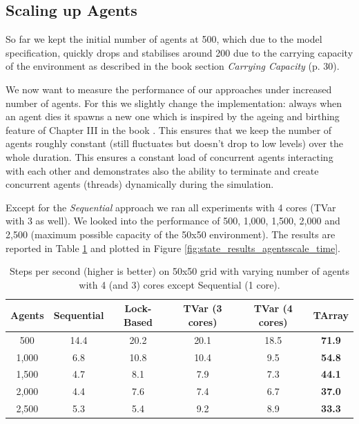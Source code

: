 \subsection{Scaling up Agents}
So far we kept the initial number of agents at 500, which due to the model specification, quickly drops and stabilises around 200 due to the carrying capacity of the environment as described in the book \cite{epstein_growing_1996} section \textit{Carrying Capacity} (p. 30).

We now want to measure the performance of our approaches under increased number of agents. For this we slightly change the implementation: always when an agent dies it spawns a new one which is inspired by the ageing and birthing feature of Chapter III in the book \cite{epstein_growing_1996}. This ensures that we keep the number of agents roughly constant (still fluctuates but doesn't drop to low levels) over the whole duration. This ensures a constant load of concurrent agents interacting with each other and demonstrates also the ability to terminate and create concurrent agents (threads) dynamically during the simulation.

Except for the \textit{Sequential} approach we ran all experiments with 4 cores (TVar with 3 as well). We looked into the performance of 500, 1,000, 1,500, 2,000 and 2,500 (maximum possible capacity of the 50x50 environment). The results are reported in Table \ref{tab:state_results_agentsscale_time} and plotted in Figure \ref{fig:state_results_agentsscale_time}.

\begin{table}
	\centering
  	\begin{tabular}{ c || c | c | c | c | c }
        Agents  & Sequential & Lock-Based & TVar (3 cores) & TVar (4 cores) & TArray  \\ \hline \hline 
    	    500     & 14.4       & 20.2		  &	20.1           & 18.5       	& \textbf{71.9}    \\ \hline
   		1,000   & 6.8        & 10.8 	      & 10.4           & 9.5         & \textbf{54.8}    \\ \hline
   		1,500   & 4.7        & 8.1 		  & 7.9            & 7.3			& \textbf{44.1}    \\ \hline
   		2,000   & 4.4        & 7.6 		  & 7.4            & 6.7    		& \textbf{37.0}    \\ \hline 
   		2,500   & 5.3        & 5.4 		  & 9.2            & 8.9			& \textbf{33.3}    \\ \hline \hline
   	\end{tabular}
  	
  	\caption{Steps per second (higher is better) on 50x50 grid with varying number of agents with 4 (and 3) cores except Sequential (1 core).}
	\label{tab:state_results_agentsscale_time}
\end{table}

